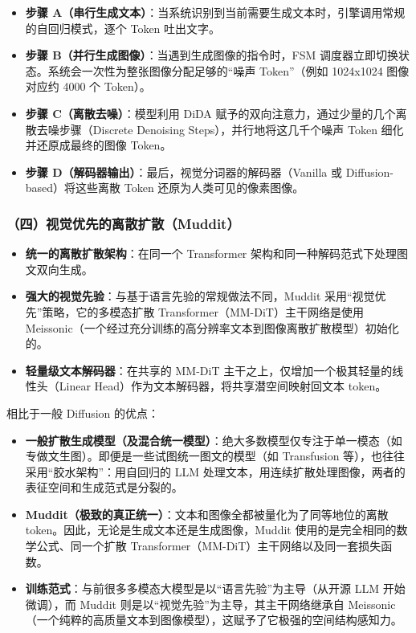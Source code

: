 \begin{itemize}
\tightlist
\item
  \textbf{步骤 A（串行生成文本）}：当系统识别到当前需要生成文本时，引擎调用常规的自回归模式，逐个 Token 吐出文字。
\item
  \textbf{步骤 B（并行生成图像）}：当遇到生成图像的指令时，FSM 调度器立即切换状态。系统会一次性为整张图像分配足够的``噪声 Token''（例如 1024x1024 图像对应约 4000 个 Token）。
\item
  \textbf{步骤 C（离散去噪）}：模型利用 DiDA 赋予的双向注意力，通过少量的几个离散去噪步骤（Discrete Denoising Steps），并行地将这几千个噪声 Token 细化并还原成最终的图像 Token。
\item
  \textbf{步骤 D（解码器输出）}：最后，视觉分词器的解码器（Vanilla 或 Diffusion-based）将这些离散 Token 还原为人类可见的像素图像。
\end{itemize}

\hypertarget{ux56dbux89c6ux89c9ux4f18ux5148ux7684ux79bbux6563ux6269ux6563muddit}{%
\subsubsection{（四）视觉优先的离散扩散（Muddit）}\label{ux56dbux89c6ux89c9ux4f18ux5148ux7684ux79bbux6563ux6269ux6563muddit}}

\begin{itemize}
\tightlist
\item
  \textbf{统一的离散扩散架构}：在同一个 Transformer 架构和同一种解码范式下处理图文双向生成。
\item
  \textbf{强大的视觉先验}：与基于语言先验的常规做法不同，Muddit 采用``视觉优先''策略，它的多模态扩散 Transformer（MM-DiT）主干网络是使用 Meissonic（一个经过充分训练的高分辨率文本到图像离散扩散模型）初始化的。
\item
  \textbf{轻量级文本解码器}：在共享的 MM-DiT 主干之上，仅增加一个极其轻量的线性头（Linear Head）作为文本解码器，将共享潜空间映射回文本 token。
\end{itemize}

相比于一般 Diffusion 的优点：

\begin{itemize}
\tightlist
\item
  \textbf{一般扩散生成模型（及混合统一模型）}：绝大多数模型仅专注于单一模态（如专做文生图）。即便是一些试图统一图文的模型（如 Transfusion 等），也往往采用``胶水架构''：用自回归的 LLM 处理文本，用连续扩散处理图像，两者的表征空间和生成范式是分裂的。
\item
  \textbf{Muddit（极致的真正统一）}：文本和图像全都被量化为了同等地位的离散 token。因此，无论是生成文本还是生成图像，Muddit 使用的是完全相同的数学公式、同一个扩散 Transformer（MM-DiT）主干网络以及同一套损失函数。
\item
  \textbf{训练范式}：与前很多多模态大模型是以``语言先验''为主导（从开源 LLM 开始微调），而 Muddit 则是以``视觉先验''为主导，其主干网络继承自 Meissonic（一个纯粹的高质量文本到图像模型），这赋予了它极强的空间结构感知力。
\end{itemize}


